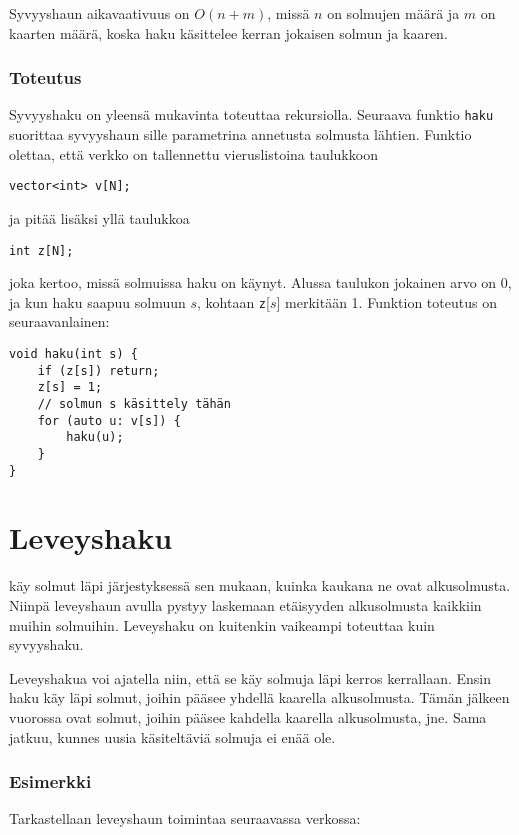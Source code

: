 Syvyyshaun aikavaativuus on $O(n+m)$,
missä $n$ on solmujen määrä ja $m$ on kaarten määrä,
koska haku käsittelee kerran jokaisen solmun ja kaaren.

\subsubsection*{Toteutus}

Syvyyshaku on yleensä mukavinta toteuttaa
rekursiolla.
Seuraava funktio \texttt{haku}
suorittaa syvyyshaun sille parametrina
annetusta solmusta lähtien.
Funktio olettaa, että
verkko on tallennettu vieruslistoina
taulukkoon
\begin{lstlisting}
vector<int> v[N];
\end{lstlisting}
ja pitää lisäksi yllä taulukkoa
\begin{lstlisting}
int z[N];
\end{lstlisting}
joka kertoo, missä solmuissa haku on käynyt.
Alussa taulukon jokainen arvo on 0,
ja kun haku saapuu solmuun $s$,
kohtaan \texttt{z}[$s$] merkitään 1.
Funktion toteutus on seuraavanlainen:
\begin{lstlisting}
void haku(int s) {
    if (z[s]) return;
    z[s] = 1;
    // solmun s käsittely tähän
    for (auto u: v[s]) {
        haku(u);
    }
}
\end{lstlisting}

\section{Leveyshaku}


käy solmut läpi järjestyksessä sen mukaan,
kuinka kaukana ne ovat alkusolmusta.
Niinpä leveyshaun avulla pystyy laskemaan
etäisyyden alkusolmusta kaikkiin
muihin solmuihin.
Leveyshaku on kuitenkin vaikeampi
toteuttaa kuin syvyyshaku.

Leveyshakua voi ajatella niin,
että se käy solmuja läpi kerros kerrallaan.
Ensin haku käy läpi solmut,
joihin pääsee yhdellä kaarella
alkusolmusta.
Tämän jälkeen vuorossa ovat
solmut, joihin pääsee kahdella
kaarella alkusolmusta, jne.
Sama jatkuu, kunnes uusia käsiteltäviä
solmuja ei enää ole.

\subsubsection*{Esimerkki}

Tarkastellaan leveyshaun toimintaa
seuraavassa verkossa:

